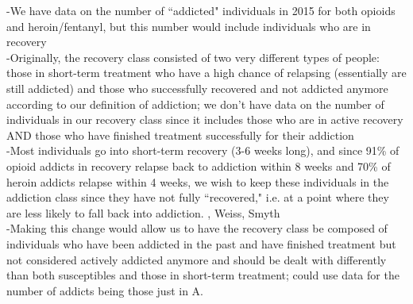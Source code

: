 \documentclass[12pt]{article}
\begin{document}
-We have data on the number of ``addicted" individuals in 2015 for both opioids and heroin/fentanyl, but  this number would include individuals who are in recovery \\
-Originally, the recovery class consisted of two very different types of people: those in short-term treatment who have a high chance of relapsing (essentially are still addicted) and those who successfully recovered and not addicted anymore according to our definition of addiction; we don't have data on the number of individuals in our recovery class since it includes those who are in active recovery AND those who have finished treatment successfully for their addiction \\
-Most individuals go into short-term recovery (3-6 weeks long), and since 91\% of opioid addicts in recovery relapse back to addiction within 8 weeks and 70\% of heroin addicts relapse within 4 weeks, we wish to keep these individuals in the addiction class since they have not fully ``recovered," i.e. at a point where they are less likely to fall back into addiction. \cite{NIH4, SAMSHA4}, Weiss, Smyth\\
-Making this change would allow us to have the recovery class be composed of individuals who have been addicted in the past and have finished treatment but not considered actively addicted anymore and should be dealt with differently than both susceptibles and those in short-term treatment; could use data for the number of addicts being those just in A. \\ 






\pagebreak


\end{document}
